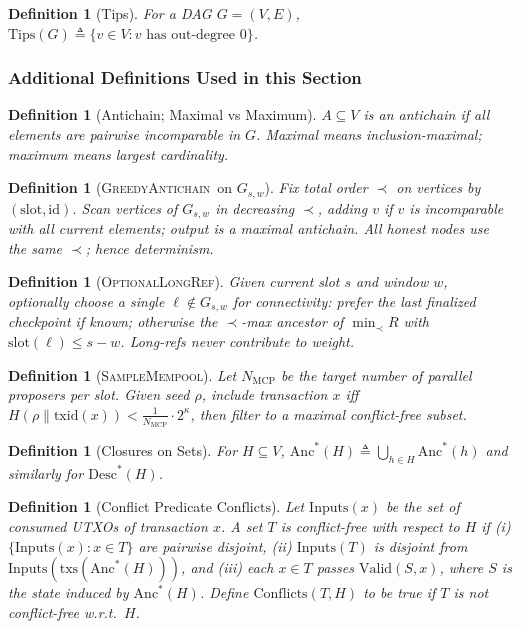 \documentclass[11pt]{article}
\newtheorem{definition}[theorem]{Definition}
\newcommand{\id}{\ensuremath{\mathrm{id}}\xspace}
\newcommand{\slot}{\ensuremath{\mathrm{slot}}\xspace}
\newcommand{\txs}{\ensuremath{\mathrm{txs}}\xspace}
\newcommand{\Anc}{\ensuremath{\mathrm{Anc}}\xspace}
\newcommand{\Desc}{\ensuremath{\mathrm{Desc}}\xspace}
\newcommand{\Valid}{\ensuremath{\mathrm{Valid}}\xspace}
\newcommand{\Conflicts}{\ensuremath{\mathrm{Conflicts}}\xspace}
\newcommand{\Inputs}{\ensuremath{\mathrm{Inputs}}\xspace}
\newcommand{\Tips}{\ensuremath{\mathrm{Tips}}\xspace}
\newcommand{\GreedyAntichain}{\textsc{GreedyAntichain}\xspace}
\newcommand{\SampleMempool}{\textsc{SampleMempool}\xspace}
\newcommand{\OptionalLongRef}{\textsc{OptionalLongRef}\xspace}
\newcommand{\MCP}{\ensuremath{\mathrm{MCP}}\xspace}
\begin{document}
\begin{definition}[Tips]
For a DAG $G=(V,E)$, $\Tips(G)\triangleq\{v\in V:\text{$v$ has out-degree $0$}\}$.
\end{definition}

\subsubsection*{Additional Definitions Used in this Section}

\begin{definition}[Antichain; Maximal vs Maximum]
$A\subseteq V$ is an antichain if all elements are pairwise incomparable in $G$. Maximal means inclusion-maximal; maximum means largest cardinality.
\end{definition}
\begin{definition}[\GreedyAntichain\ on $G_{s,w}$]
Fix total order $\prec$ on vertices by $(\slot,\id)$. Scan vertices of $G_{s,w}$ in decreasing $\prec$, adding $v$ if $v$ is incomparable with all current elements; output is a \emph{maximal} antichain. All honest nodes use the same $\prec$; hence determinism.
\end{definition}
\begin{definition}[\OptionalLongRef]
Given current slot $s$ and window $w$, optionally choose a single $\ell\notin G_{s,w}$ for connectivity: prefer the last finalized checkpoint if known; otherwise the $\prec$-max ancestor of $\min_{\prec}R$ with $\slot(\ell)\le s-w$. Long-refs never contribute to weight.
\end{definition}
\begin{definition}[\SampleMempool]
Let $N_{\MCP}$ be the target number of parallel proposers per slot. Given seed $\rho$, include transaction $x$ iff
$H(\rho\|\mathrm{txid}(x))<\tfrac{1}{N_{\MCP}}\cdot 2^\kappa$, then filter to a maximal conflict-free subset.
\end{definition}
\begin{definition}[Closures on Sets]
For $H\subseteq V$, $\Anc^*(H)\triangleq \bigcup_{h\in H}\Anc^*(h)$ and similarly for $\Desc^*(H)$.
\end{definition}
\begin{definition}[Conflict Predicate \Conflicts]
Let $\Inputs(x)$ be the set of consumed UTXOs of transaction $x$. A set $T$ is conflict-free with respect to $H$ if (i) $\{\Inputs(x):x\in T\}$ are pairwise disjoint,
(ii) $\Inputs(T)$ is disjoint from $\Inputs(\txs(\Anc^*(H)))$, and (iii) each $x\in T$ passes $\Valid(S,x)$, where $S$ is the state induced by $\Anc^*(H)$. Define $\Conflicts(T,H)$ to be true if $T$ is \emph{not} conflict-free w.r.t.\ $H$.
\end{definition}
\end{document}
